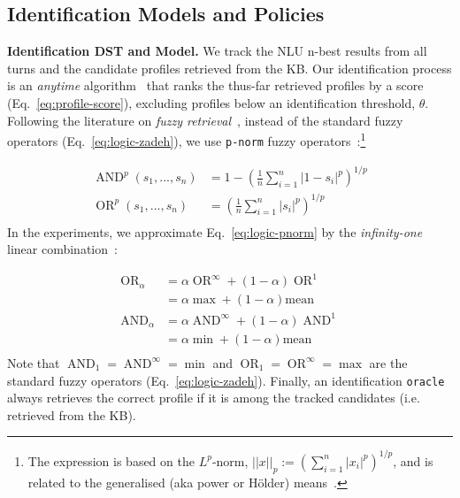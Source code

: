 \documentclass[11pt]{article}
\newcommand{\opAnd}{\operatorname{AND}}
\newcommand{\opOr}{\operatorname{OR}}
\newcommand{\sparagraph}[1]{\noindent\textbf{#1.}}
\begin{document}
{\subsection{Identification Models and Policies}
\label{sec:identification-policy}



\sparagraph{Identification DST and Model}
We track the NLU n-best results from all turns
and the candidate profiles retrieved from the KB.
Our identification process
is an \textit{anytime} algorithm~\cite{zilberstein1996using}
that ranks the thus-far retrieved profiles
by a score (Eq.~\ref{eq:profile-score}),
excluding profiles below an identification threshold, $\theta$.
Following the literature on \textit{fuzzy retrieval}~\cite{zadrozny2009fuzzy},
instead of the standard fuzzy operators (Eq.~\ref{eq:logic-zadeh}),
we use \texttt{p-norm} fuzzy operators~\cite{salton1983extended}:\footnote{
The expression is based on the $L^p$-norm,
$||x||_p:=\left( \sum_{i=1}^{n}|x_i| ^p \right)^{1/p}$,
and is related to the generalised (aka power or Hölder) means~\cite{bullen2013handbook}.}

\vspace{-3mm}
{\small
\begin{equation}
\begin{aligned}
\opAnd^p \left(  s_1, ..., s_n \right)
&= 1 - \left( \frac{1}{n} \sum_{i=1}^{n} \left| 1-s_i \right| ^p \right)^{1/p} \\
\opOr^p \left( s_1, ..., s_n \right)
 &= \left( \frac{1}{n} \sum_{i=1}^{n} |s_i| ^p \right)^{1/p} \\
\end{aligned}
\label{eq:logic-pnorm}
\end{equation}
}In the experiments,
we approximate Eq.~\ref{eq:logic-pnorm} by the \textit{infinity-one} linear combination~\cite{smith1990aspects}:

\vspace{-1.5mm}
{\small
\begin{equation}
\begin{aligned}
\opOr_{\alpha} &=\alpha \opOr^{\infty} + (1-\alpha) \opOr^{1}\\
&=\alpha \max +(1-\alpha) \textrm{mean} \\
\opAnd_{\alpha} &=\alpha \opAnd^{\infty} + (1-\alpha) \opAnd^{1}\\
&=\alpha \min + (1-\alpha) \textrm{mean} \\
\end{aligned}
\label{eq:logic-infinity-one}
\end{equation}
}Note that $\opAnd_{1}=\opAnd^{\infty}=\min$ and $\opOr_{1}= \opOr^{\infty} =\max$ are the standard fuzzy operators (Eq.~\ref{eq:logic-zadeh}).
Finally, an identification \texttt{oracle}
always retrieves the correct profile if it is among the tracked candidates (i.e. retrieved from the KB).

}
\end{document}
